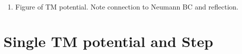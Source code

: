 \begin{enumerate}
  \item Figure of TM potential.  Note connection to Neumann BC and reflection.  
\end{enumerate}

\section{Single TM potential and Step}

